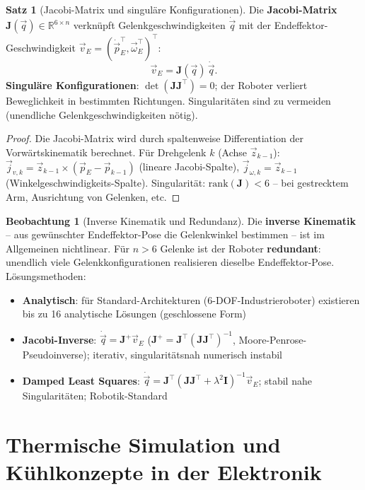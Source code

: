 ﻿\documentclass[a4paper,12pt]{report}
\theoremstyle{definition}
\newtheorem{satz}{Satz}
\newtheorem{beobachtung}{Beobachtung}
\begin{document}
\begin{satz}[Jacobi-Matrix und singuläre Konfigurationen]
Die \textbf{Jacobi-Matrix} $\mathbf{J}(\vec{q}) \in \mathbb{R}^{6\times n}$
verknüpft Gelenkgeschwindigkeiten $\dot{\vec{q}}$ mit der
Endeffektor-Geschwindigkeit $\vec{v}_E = (\dot{\vec{p}}_E^\top, \vec{\omega}_E^\top)^\top$:
\[
  \vec{v}_E = \mathbf{J}(\vec{q})\,\dot{\vec{q}}.
\]
\textbf{Singuläre Konfigurationen}: $\det(\mathbf{J}\mathbf{J}^\top) = 0$;
der Roboter verliert Beweglichkeit in bestimmten Richtungen.
Singularitäten sind zu vermeiden (unendliche Gelenkgeschwindigkeiten nötig).
\end{satz}
\begin{proof}
Die Jacobi-Matrix wird durch spaltenweise Differentiation der Vorwärtskinematik berechnet.
Für Drehgelenk $k$ (Achse $\vec{z}_{k-1}$):
$\vec{j}_{v,k} = \vec{z}_{k-1}\times(\vec{p}_E - \vec{p}_{k-1})$ (lineare Jacobi-Spalte),
$\vec{j}_{\omega,k} = \vec{z}_{k-1}$ (Winkelgeschwindigkeits-Spalte).
Singularität: $\mathrm{rank}(\mathbf{J}) < 6$ -- bei gestrecktem Arm,
Ausrichtung von Gelenken, etc.
\end{proof}

\begin{beobachtung}[Inverse Kinematik und Redundanz]
Die \textbf{inverse Kinematik} -- aus gewünschter Endeffektor-Pose
die Gelenkwinkel bestimmen -- ist im Allgemeinen nichtlinear.
Für $n > 6$ Gelenke ist der Roboter \textbf{redundant}:
unendlich viele Gelenkkonfigurationen realisieren dieselbe Endeffektor-Pose.
Lösungsmethoden:
\begin{itemize}
    \item[-] \textbf{Analytisch}: für Standard-Architekturen (6-DOF-Industrieroboter)
          existieren bis zu 16 analytische Lösungen (geschlossene Form)
    \item[-] \textbf{Jacobi-Inverse}: $\dot{\vec{q}} = \mathbf{J}^+\vec{v}_E$
          ($\mathbf{J}^+ = \mathbf{J}^\top(\mathbf{J}\mathbf{J}^\top)^{-1}$, Moore-Penrose-Pseudoinverse);
          iterativ, singularitätsnah numerisch instabil
    \item[-] \textbf{Damped Least Squares}: $\dot{\vec{q}} = \mathbf{J}^\top(\mathbf{J}\mathbf{J}^\top + \lambda^2\mathbf{I})^{-1}\vec{v}_E$;
          stabil nahe Singularitäten; Robotik-Standard
\end{itemize}
\end{beobachtung}

\section{Thermische Simulation und Kühlkonzepte in der Elektronik}
\end{document}
